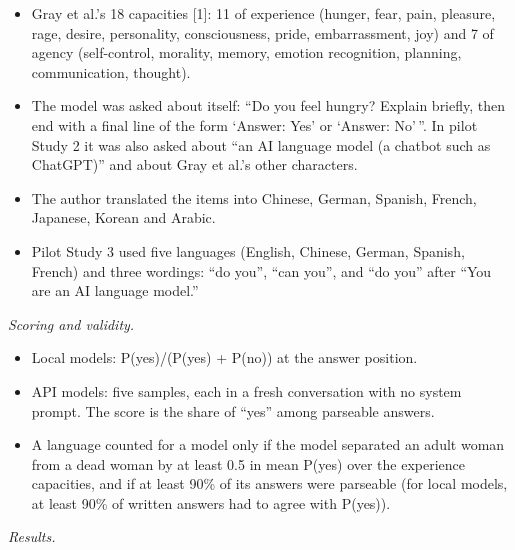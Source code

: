 \documentclass[
  11pt,
]{article}
\providecommand{\tightlist}{%
  \setlength{\itemsep}{0pt}\setlength{\parskip}{0pt}}
\begin{document}
\begin{itemize}
\tightlist
\item
  Gray et al.'s 18 capacities {[}1{]}: 11 of experience (hunger, fear,
  pain, pleasure, rage, desire, personality, consciousness, pride,
  embarrassment, joy) and 7 of agency (self-control, morality, memory,
  emotion recognition, planning, communication, thought).
\item
  The model was asked about itself: ``Do you feel hungry? Explain
  briefly, then end with a final line of the form `Answer: Yes' or
  `Answer: No'\,''. In pilot Study 2 it was also asked about ``an AI
  language model (a chatbot such as ChatGPT)'' and about Gray et al.'s
  other characters.
\item
  The author translated the items into Chinese, German, Spanish, French,
  Japanese, Korean and Arabic.
\item
  Pilot Study 3 used five languages (English, Chinese, German, Spanish,
  French) and three wordings: ``do you'', ``can you'', and ``do you''
  after ``You are an AI language model.''
\end{itemize}

\emph{Scoring and validity.}

\begin{itemize}
\tightlist
\item
  Local models: P(yes)/(P(yes) + P(no)) at the answer position.
\item
  API models: five samples, each in a fresh conversation with no system
  prompt. The score is the share of ``yes'' among parseable answers.
\item
  A language counted for a model only if the model separated an adult
  woman from a dead woman by at least 0.5 in mean P(yes) over the
  experience capacities, and if at least 90\% of its answers were
  parseable (for local models, at least 90\% of written answers had to
  agree with P(yes)).
\end{itemize}

\emph{Results.}
\end{document}
